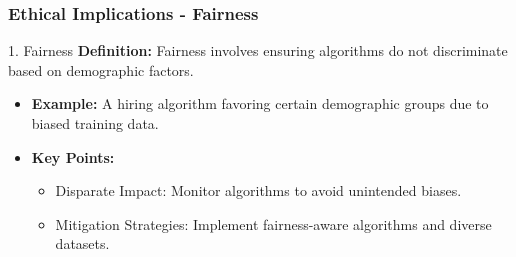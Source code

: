 \documentclass[aspectratio=169]{beamer}
\begin{document}
\begin{frame}[fragile]
    \frametitle{Ethical Implications - Fairness}
    \begin{block}{1. Fairness}
        \textbf{Definition:} Fairness involves ensuring algorithms do not discriminate based on demographic factors.
    \end{block}
    \begin{itemize}
        \item \textbf{Example:} A hiring algorithm favoring certain demographic groups due to biased training data.
        
        \item \textbf{Key Points:}
        \begin{itemize}
            \item Disparate Impact: Monitor algorithms to avoid unintended biases.
            \item Mitigation Strategies: Implement fairness-aware algorithms and diverse datasets.
        \end{itemize}
    \end{itemize}
\end{frame}
\end{document}
